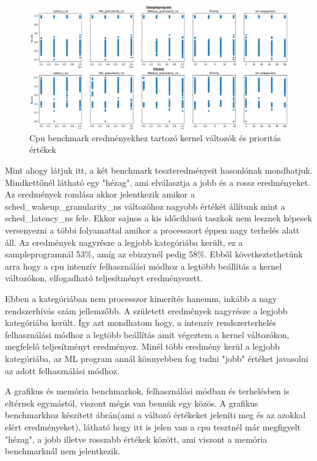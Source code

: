 \begin{figure}[h!]
\centering
\includegraphics[scale=0.35]{images/cpuBenchmarkValues.png}
\caption{Cpu benchmark eredményekhez tartozó kernel változók és prioritás értékek}
\label{fig:CpuParameters}
\end{figure}

Mint ahogy látjuk itt, a két benchmark teszteredményeit hasonlónak mondhatjuk. Mindkettőnél látható egy "hézag", ami elválasztja a jobb és a rossz eredményeket. Az eredmények romlása akkor jelentkezik amikor a sched\_wakeup\_granularity\_ns változóhoz nagyobb értékét állítunk mint a sched\_latency\_ns fele. Ekkor sajnos a kis időciklusú taszkok nem lesznek képesek versenyezni a többi folyamattal amikor a processzort éppen nagy terhelés alatt áll.
Az eredmények nagyrésze a legjobb kategóriába került, ez a sampleprogramnál 53\%, amíg az ebizzynél pedig 58\%. Ebből következtethetünk arra hogy a cpu intenzív felhasználási módhoz a legtöbb beállítás a kernel változókon, elfogadható teljesítményt eredményezett.

Ebben a kategóriában nem processzor kimerítés hanemm, inkább a nagy rendszerhívás szám jellemzőbb.
A született eredmények nagyrésze a legjobb kategóriába került. Így azt mondhatom hogy, a intenzív rendszerterhelés felhasználási módhoz a legtöbb beállítás amit végeztem a kernel változókon, megfelelő teljesítményt eredményez. Minél több eredmény kerül a legjobb kategóriába, az ML program annál könnyebben fog tudni "jobb" értéket javasolni az adott felhasználási módhoz.


A grafikus és memória benchmarkok, felhasználási módban és terhelésben is eltérnek egymástól, viszont mégis van bennük egy közös.
A grafikus benchmarkhoz készített ábrán(ami a változó értékeket jeleníti meg és az azokkal elért eredményeket), látható hogy itt is jelen van a cpu tesztnél már megfigyelt "hézag", a jobb illetve rosszabb értékek között, ami viszont a memória benchmarknál nem jelentkezik.

